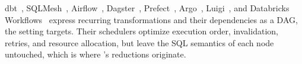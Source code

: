 dbt~\cite{dbtWhatExactly}, SQLMesh~\cite{sqlmeshOverview}, Airflow~\cite{airflowDags}, Dagster~\cite{dagsterAssets}, Prefect~\cite{prefectTasks}, Argo~\cite{argoDag}, Luigi~\cite{luigiDocs}, and Databricks Workflows~\cite{databricksJobs} express recurring transformations and their dependencies as a DAG, the setting \dagsmith targets. Their schedulers optimize execution order, invalidation, retries, and resource allocation, but leave the SQL semantics of each node untouched, which is where \dagsmith's reductions originate.

